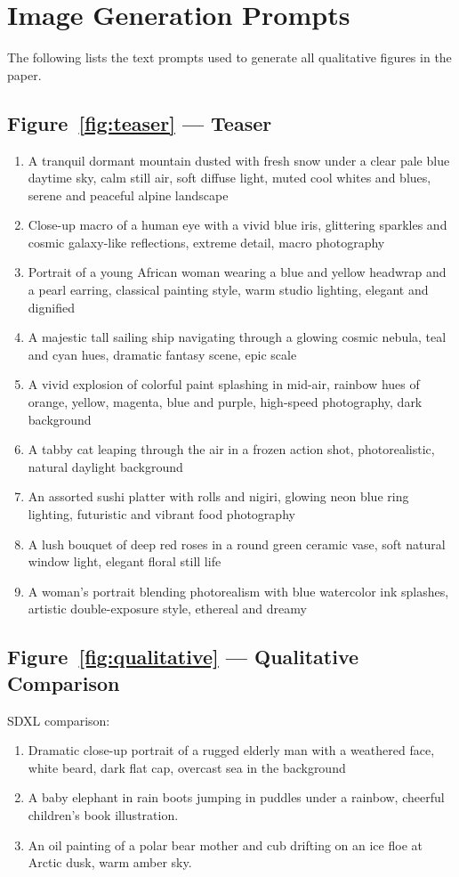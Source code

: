 \section{Image Generation Prompts}
\label{app:prompts}

The following lists the text prompts used to generate all qualitative figures in the paper.

\subsection*{Figure~\ref{fig:teaser} --- Teaser}
\begin{enumerate}
  \item A tranquil dormant mountain dusted with fresh snow under a clear pale blue daytime sky, calm still air, soft diffuse light, muted cool whites and blues, serene and peaceful alpine landscape
  \item Close-up macro of a human eye with a vivid blue iris, glittering sparkles and cosmic galaxy-like reflections, extreme detail, macro photography
  \item Portrait of a young African woman wearing a blue and yellow headwrap and a pearl earring, classical painting style, warm studio lighting, elegant and dignified
  \item A majestic tall sailing ship navigating through a glowing cosmic nebula, teal and cyan hues, dramatic fantasy scene, epic scale
  \item A vivid explosion of colorful paint splashing in mid-air, rainbow hues of orange, yellow, magenta, blue and purple, high-speed photography, dark background
  \item A tabby cat leaping through the air in a frozen action shot, photorealistic, natural daylight background
  \item An assorted sushi platter with rolls and nigiri, glowing neon blue ring lighting, futuristic and vibrant food photography
  \item A lush bouquet of deep red roses in a round green ceramic vase, soft natural window light, elegant floral still life
  \item A woman's portrait blending photorealism with blue watercolor ink splashes, artistic double-exposure style, ethereal and dreamy
\end{enumerate}

\subsection*{Figure~\ref{fig:qualitative} --- Qualitative Comparison}
SDXL comparison:
\begin{enumerate}
  \item Dramatic close-up portrait of a rugged elderly man with a weathered face, white beard, dark flat cap, overcast sea in the background
  \item A baby elephant in rain boots jumping in puddles under a rainbow, cheerful children's book illustration.
  \item An oil painting of a polar bear mother and cub drifting on an ice floe at Arctic dusk, warm amber sky.
\end{enumerate}


